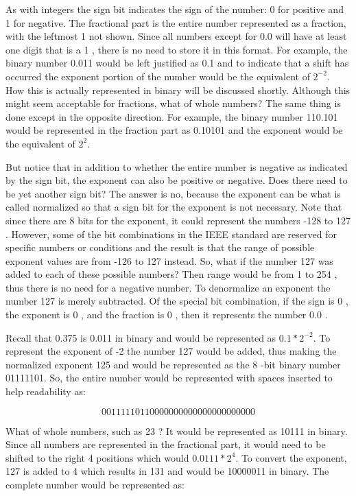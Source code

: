 \documentclass[10pt]{article}
\begin{document}
As with integers the sign bit indicates the sign of the number: 0 for positive and 1 for negative. The fractional part is the entire number represented as a fraction, with the leftmost 1 not shown. Since all numbers except for 0.0 will have at least one digit that is a 1 , there is no need to store it in this format. For example, the binary number 0.011 would be left justified as 0.1 and to indicate that a shift has occurred the exponent portion of the number would be the equivalent of $2^{-2}$. How this is actually represented in binary will be discussed shortly. Although this might seem acceptable for fractions, what of whole numbers? The same thing is done except in the opposite direction. For example, the binary number 110.101 would be represented in the fraction part as 0.10101 and the exponent would be the equivalent of $2^{2}$.

But notice that in addition to whether the entire number is negative as indicated by the sign bit, the exponent can also be positive or negative. Does there need to be yet another sign bit? The answer is no, because the exponent can be what is called normalized so that a sign bit for the exponent is not necessary. Note that since there are 8 bits for the exponent, it could represent the numbers -128 to 127 . However, some of the bit combinations in the IEEE standard are reserved for specific numbers or conditions and the result is that the range of possible exponent values are from -126 to 127 instead. So, what if the number 127 was added to each of these possible numbers? Then range would be from 1 to 254 , thus there is no need for a negative number. To denormalize an exponent the number 127 is merely subtracted. Of the special bit combination, if the sign is 0 , the exponent is 0 , and the fraction is 0 , then it represents the number 0.0 .

Recall that 0.375 is 0.011 in binary and would be represented as $0.1 * 2^{-2}$. To represent the exponent of -2 the number 127 would be added, thus making the normalized exponent 125 and would be represented as the 8 -bit binary number 01111101. So, the entire number would be represented with spaces inserted to help readability as:

$$
00111110110000000000000000000000
$$

What of whole numbers, such as 23 ? It would be represented as 10111 in binary. Since all numbers are represented in the fractional part, it would need to be shifted to the right 4 positions which would $0.0111 * 2^{4}$. To convert the exponent, 127 is added to 4 which results in 131 and would be 10000011 in binary. The complete number would be represented as:
\end{document}
